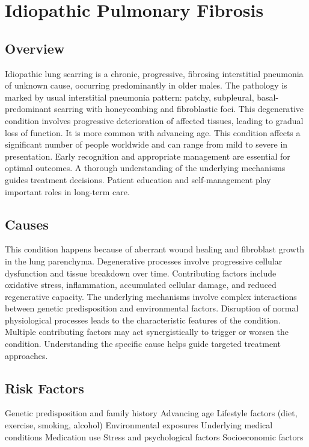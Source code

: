 \chapter{Idiopathic Pulmonary Fibrosis}
\label{sec:Idiopathic Pulmonary Fibrosis}

\section{Overview}
Idiopathic lung scarring is a chronic, progressive, fibrosing interstitial pneumonia of unknown cause, occurring predominantly in older males. The pathology is marked by usual interstitial pneumonia pattern: patchy, subpleural, basal-predominant scarring with honeycombing and fibroblastic foci. This degenerative condition involves progressive deterioration of affected tissues, leading to gradual loss of function. It is more common with advancing age. This condition affects a significant number of people worldwide and can range from mild to severe in presentation. Early recognition and appropriate management are essential for optimal outcomes. A thorough understanding of the underlying mechanisms guides treatment decisions. Patient education and self-management play important roles in long-term care.
\section{Causes}
This condition happens because of aberrant wound healing and fibroblast growth in the lung parenchyma. Degenerative processes involve progressive cellular dysfunction and tissue breakdown over time. Contributing factors include oxidative stress, inflammation, accumulated cellular damage, and reduced regenerative capacity. The underlying mechanisms involve complex interactions between genetic predisposition and environmental factors. Disruption of normal physiological processes leads to the characteristic features of the condition. Multiple contributing factors may act synergistically to trigger or worsen the condition. Understanding the specific cause helps guide targeted treatment approaches.
\section{Risk Factors}
Genetic predisposition and family history Advancing age Lifestyle factors (diet, exercise, smoking, alcohol) Environmental exposures Underlying medical conditions Medication use Stress and psychological factors Socioeconomic factors

